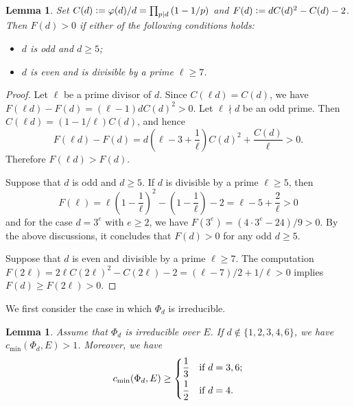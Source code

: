 \documentclass[11pt]{amsart}
\theoremstyle{plain}
\newtheorem{lem}[thm]{Lemma}
\theoremstyle{definition}
\numberwithin{equation}{section}
\newcommand{\defeq}{\vcentcolon=}
\begin{document}
\begin{lem}
  \label{lem:C(d)}
  Set $C(d) \defeq \varphi(d)/d = \prod_{p \mid d}\left(1-1/p\right)$
  and $F(d) \defeq dC(d)^2-C(d)-2$.
  Then $F(d)>0$ if either of the following conditions holds:
  \begin{itemize}
    \item $d$ is odd and $d\geq5$;
    \item $d$ is even and is divisible by a prime $\ell\geq7$.
  \end{itemize}
\end{lem}
\begin{proof}
  Let $\ell$ be a prime divisor of $d$. Since $C(\ell d)=C(d)$, we have $F(\ell d)-F(d)=(\ell-1)dC(d)^2>0$.
  Let $\ell\nmid d$ be an odd prime. Then $C(\ell d) = (1-1/\ell)C(d)$, and hence
  \[
  F(\ell d)-F(d)
  =d\left(\ell-3+\frac{1}{\ell}\right)C(d)^2+\frac{C(d)}{\ell}>0.
  \]
  Therefore $F(\ell d) > F(d)$.

  Suppose that $d$ is odd and $d\geq5$. If $d$ is divisible by a prime $\ell\geq5$, then
  \[
  F(\ell)=\ell\left(1-\frac{1}{\ell}\right)^2-\left(1-\frac{1}{\ell}\right)-2
  =\ell-5+\frac{2}{\ell}>0
  \]
and for the case $d=3^e$ with $e \geq 2$, we have $F(3^e) = (4 \cdot 3^e - 24)/9 > 0$.
By the above discussions, it concludes that $F(d) > 0$ for any odd $d \geq 5$.

  Suppose that $d$ is even and divisible by a prime $\ell\geq7$. 
  The computation $F(2\ell)=2\ell C(2\ell)^2-C(2\ell)-2
  =(\ell-7)/2+1/\ell>0$ implies
  $F(d)\geq F(2\ell)>0$.
\end{proof}
We first consider the case in which $\Phi_d$ is irreducible.
\begin{lem}\label{lemma_RT_sum_irreducible}
  Assume that $\Phi_d$ is irreducible over $E$.
  If $d \not\in \{1,2,3,4,6\}$,
  we have $c_{\min}(\Phi_d,E)> 1$.
  Moreover, we have
  \[
    c_{\min}(\Phi_d, E) \geq
    \begin{dcases}
      \frac{1}{3} & \text{if $d = 3,6$;}\\
      \frac{1}{2} & \text{if $d=4$.}
    \end{dcases}
  \]
\end{lem}
\end{document}
